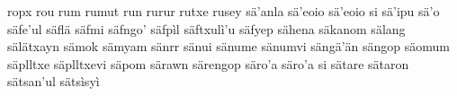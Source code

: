 ropx\hspace{2mm}
rou\hspace{2mm}
rum\hspace{2mm}
rumut\hspace{2mm}
run\hspace{2mm}
rurur\hspace{2mm}
rutxe\hspace{2mm}
rusey\hspace{2mm}
sä'anla\hspace{2mm}
sä'eoio\hspace{2mm}
sä'eoio si\hspace{2mm}
sä'ipu\hspace{2mm}
sä'o\hspace{2mm}
säfe'ul\hspace{2mm}
säflä\hspace{2mm}
säfmi\hspace{2mm}
säfngo'\hspace{2mm}
säfpìl\hspace{2mm}
säftxulì'u\hspace{2mm}
säfyep\hspace{2mm}
sähena\hspace{2mm}
säkanom\hspace{2mm}
sälang\hspace{2mm}
sälätxayn\hspace{2mm}
sämok\hspace{2mm}
sämyam\hspace{2mm}
sänrr\hspace{2mm}
sänui\hspace{2mm}
sänume\hspace{2mm}
sänumvi\hspace{2mm}
sängä'än\hspace{2mm}
sängop\hspace{2mm}
säomum\hspace{2mm}
säplltxe\hspace{2mm}
säplltxevi\hspace{2mm}
säpom\hspace{2mm}
särawn\hspace{2mm}
särengop\hspace{2mm}
säro'a\hspace{2mm}
säro'a si\hspace{2mm}
sätare\hspace{2mm}
sätaron\hspace{2mm}
sätsan'ul\hspace{2mm}
sätsìsyì\hspace{2mm}
